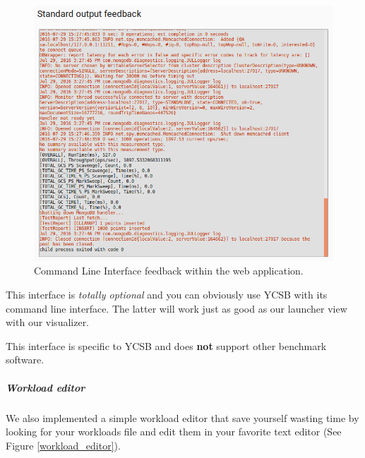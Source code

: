 \documentclass[a4paper,11pt]{report}
\begin{document}
\begin{figure}[ht]
\begin{center}
\includegraphics[width=1\linewidth]{images/cli_feedback.png}
\caption{Command Line Interface feedback within the web application.}
\label{cli_feedback}
\end{center}
\end{figure}

\bigskip

This interface is \textit{totally optional} and you can obviously use YCSB with its command line interface. The latter will work just as good as our launcher view with our visualizer.

This interface is specific to YCSB and does \textbf{not} support other benchmark software.

\subparagraph{Workload editor}

We also implemented a simple workload editor that save yourself wasting time by looking for your workloads file and edit them in your favorite text editor (See Figure \ref{workload_editor}).
\end{document}
